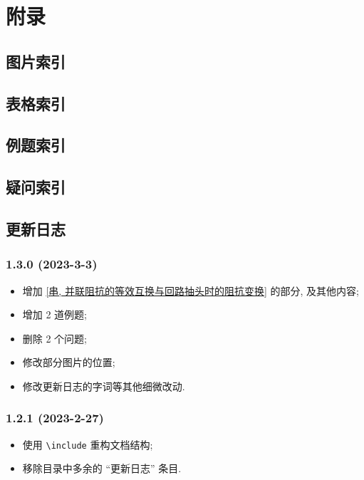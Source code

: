 \section{附录} \label{附录}
\subsection{图片索引} \label{图片索引}
\makeatletter
{}
\makeatother

\subsection{表格索引} \label{表格索引}
\makeatletter
{}
\makeatother

\subsection{例题索引} \label{例题索引}
\listofexampleprobs

\subsection{疑问索引} \label{疑问索引}
\listofquestions

\subsection{更新日志} \label{更新日志}
\subsubsection*{1.3.0 (2023-3-3)}
\begin{itemize}
    \item 增加 \ref{串, 并联阻抗的等效互换与回路抽头时的阻抗变换} 的部分, 及其他内容;
    \item 增加 2 道例题;
    \item 删除 2 个问题;
    \item 修改部分图片的位置;
    \item 修改更新日志的字词等其他细微改动.
\end{itemize}

\subsubsection*{1.2.1 (2023-2-27)}
\begin{itemize}
    \item 使用 \texttt{\textbackslash include} 重构文档结构;
    \item 移除目录中多余的 ``更新日志'' 条目.
\end{itemize}

